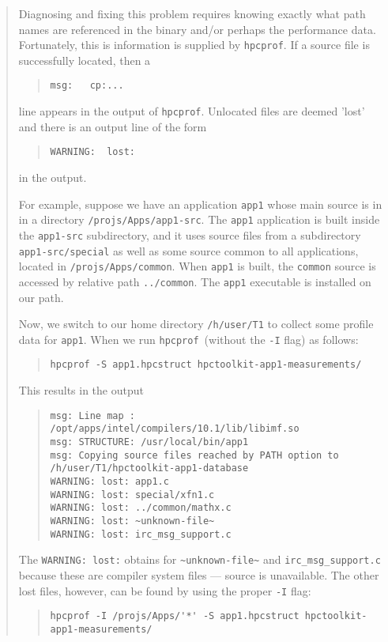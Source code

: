 \documentclass{article}
\newcommand{\hpcprof}{\texttt{hpcprof}}
\begin{document}
\begin{quote}
Diagnosing and fixing this problem requires knowing exactly what path
names are referenced in the binary and/or perhaps the performance
data. Fortunately, this is information is supplied by \hpcprof .
If a source file is successfully located, then a 
\begin{quote}
\verb|msg:   cp:...|
\end{quote}
line appears in the output of \hpcprof . Unlocated files are deemed 'lost'
and there is an output line of the form 
\begin{quote}
\verb|WARNING:  lost:|
\end{quote}
in the output.

For example, suppose we have an application \verb|app1| whose main source 
is in in a directory \verb|/projs/Apps/app1-src|. The \verb|app1|
application is built inside the \verb|app1-src| subdirectory, and it uses
source files from a subdirectory \verb|app1-src/special| as well as some
source common to all applications, located in
\verb|/projs/Apps/common|. When \verb|app1| is built, the
\verb|common| source is accessed by relative path \verb|../common|.
The \verb|app1| executable is installed on our path.

Now, we switch to our home directory \verb|/h/user/T1| to collect
some profile data for \verb|app1|.
When we run \hpcprof\ (without the \verb|-I| flag) as follows:
\begin{quote}
  \verb|hpcprof -S app1.hpcstruct hpctoolkit-app1-measurements/|
\end{quote}
This results in the output
\begin{quote}
\begin{Verbatim}[fontsize=\small]
msg: Line map : /opt/apps/intel/compilers/10.1/lib/libimf.so
msg: STRUCTURE: /usr/local/bin/app1
msg: Copying source files reached by PATH option to /h/user/T1/hpctoolkit-app1-database
WARNING: lost: app1.c
WARNING: lost: special/xfn1.c
WARNING: lost: ../common/mathx.c
WARNING: lost: ~unknown-file~
WARNING: lost: irc_msg_support.c
\end{Verbatim}
\end{quote}
The \verb|WARNING: lost:| obtains for \verb|~unknown-file~| and
\verb|irc_msg_support.c| because these are compiler system files --- source
is unavailable. The other lost files, however, can be found by using
the proper \verb|-I| flag:
\begin{quote}
\begin{verbatim}
hpcprof -I /projs/Apps/'*' -S app1.hpcstruct hpctoolkit-app1-measurements/
\end{verbatim}
\end{quote}


\end{quote}
\end{document}
